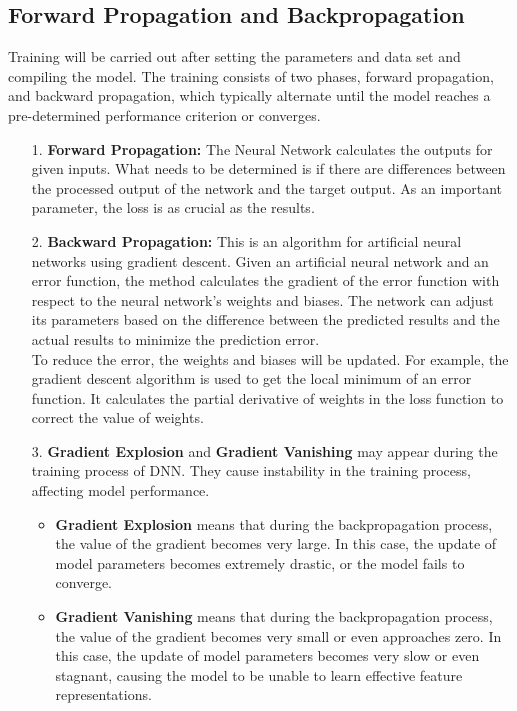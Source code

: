 \documentclass[english,version-2022-01]{uzl-thesis}
\begin{document}
\subsection{Forward Propagation and Backpropagation}
Training will be carried out after setting the parameters and data set and compiling the model. The training consists of two phases, forward propagation, and backward propagation, which typically alternate until the model reaches a pre-determined performance criterion or converges.
\begin{itemize}
    \item[1.] \textbf{Forward Propagation:} The Neural Network calculates the outputs for given inputs. What needs to be determined is if there are differences between the processed output of the network and the target output. As an important parameter, the loss is as crucial as the results.\\
    \item[2.] \textbf{Backward Propagation:} This is an algorithm for artificial neural networks using gradient descent.\cite{backpropagation} Given an artificial neural network and an error function, the method calculates the gradient of the error function with respect to the neural network's weights and biases.\cite{rumelhart1986learning} The network can adjust its parameters based on the difference between the predicted results and the actual results to minimize the prediction error.\\
    To reduce the error, the weights and biases will be updated. For example, the gradient descent algorithm is used to get the local minimum of an error function.\cite{ruder2017overview} It calculates the partial derivative of weights in the loss function to correct the value of weights.\\
    \item[3.] \textbf{Gradient Explosion} and \textbf{Gradient Vanishing}\label{Gradient Explosion and Gradient Vanishing} may appear during the training process of DNN. They cause instability in the training process, affecting model performance.\cite{grosse2017lecture}
        \begin{itemize}
            \item \textbf{Gradient Explosion} means that during the backpropagation process, the value of the gradient becomes very large. In this case, the update of model parameters becomes extremely drastic, or the model fails to converge.\\
            \item \textbf{Gradient Vanishing} means that during the backpropagation process, the value of the gradient becomes very small or even approaches zero. In this case, the update of model parameters becomes very slow or even stagnant, causing the model to be unable to learn effective feature representations.

\end{itemize}
\end{itemize}
\end{document}

